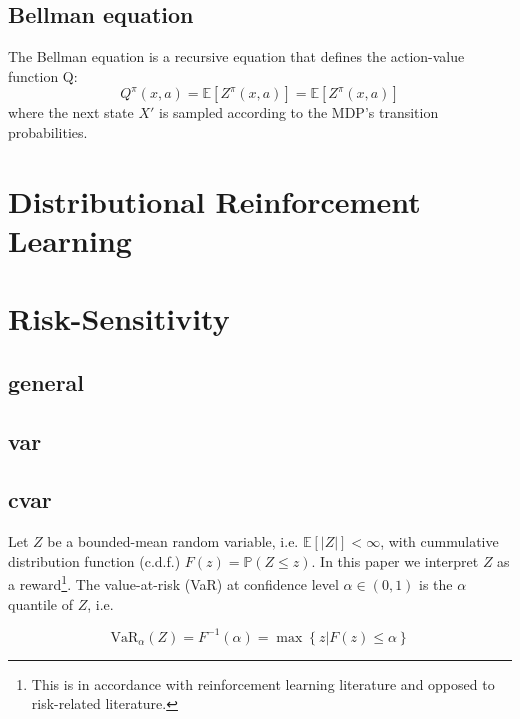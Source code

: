 \subsection{Bellman equation}
The Bellman equation is a recursive equation that defines the action-value function Q:
\begin{equation}
Q^\pi(x, a) = \mathbb{E}\left[ Z^\pi(x, a) \right] = \mathbb{E}\left[ Z^\pi(x, a) \right]
\end{equation}
where the next state $X'$ is sampled according to the MDP's transition probabilities.

\section{Distributional Reinforcement Learning}




\section{Risk-Sensitivity}\label{sec:prelim:risk}

\subsection{general}

\subsection{var}

\subsection{cvar}

Let $Z$ be a bounded-mean random variable, i.e. $\mathbb{E}[|Z|] < \infty$, with cummulative distribution function (c.d.f.) $F(z) = \mathbb{P}(Z \le z)$.
In this paper we interpret $Z$ as a reward\footnote{This is in accordance with reinforcement learning literature and opposed to risk-related literature.}. The value-at-risk (VaR) at confidence level $\alpha \in (0,1)$ is the $\alpha$ quantile of $Z$, i.e. 

\begin{equation}
\text{VaR}_\alpha(Z)=F^{-1}(\alpha)=\max\left\lbrace z | F(z) \le \alpha \right\rbrace
\end{equation}

